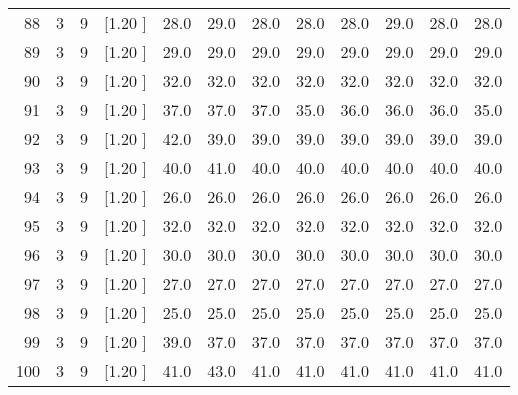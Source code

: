 \documentclass[12pt,a4paper]{article}
\begin{document}
\begin{center}
{\begin{tabular}{r r r r r r r r r r r r}
  88&  3&  9&[1.20      ]&    28.0&    29.0&    28.0&    28.0&    28.0&    29.0&    28.0&    28.0\\[-0.02in]
  89&  3&  9&[1.20      ]&    29.0&    29.0&    29.0&    29.0&    29.0&    29.0&    29.0&    29.0\\[-0.02in]
  90&  3&  9&[1.20      ]&    32.0&    32.0&    32.0&    32.0&    32.0&    32.0&    32.0&    32.0\\[-0.02in]
  91&  3&  9&[1.20      ]&    37.0&    37.0&    37.0&    35.0&    36.0&    36.0&    36.0&    35.0\\[-0.02in]
  92&  3&  9&[1.20      ]&    42.0&    39.0&    39.0&    39.0&    39.0&    39.0&    39.0&    39.0\\[-0.02in]
  93&  3&  9&[1.20      ]&    40.0&    41.0&    40.0&    40.0&    40.0&    40.0&    40.0&    40.0\\[-0.02in]
  94&  3&  9&[1.20      ]&    26.0&    26.0&    26.0&    26.0&    26.0&    26.0&    26.0&    26.0\\[-0.02in]
  95&  3&  9&[1.20      ]&    32.0&    32.0&    32.0&    32.0&    32.0&    32.0&    32.0&    32.0\\[-0.02in]
  96&  3&  9&[1.20      ]&    30.0&    30.0&    30.0&    30.0&    30.0&    30.0&    30.0&    30.0\\[-0.02in]
  97&  3&  9&[1.20      ]&    27.0&    27.0&    27.0&    27.0&    27.0&    27.0&    27.0&    27.0\\[-0.02in]
  98&  3&  9&[1.20      ]&    25.0&    25.0&    25.0&    25.0&    25.0&    25.0&    25.0&    25.0\\[-0.02in]
  99&  3&  9&[1.20      ]&    39.0&    37.0&    37.0&    37.0&    37.0&    37.0&    37.0&    37.0\\[-0.02in]
 100&  3&  9&[1.20      ]&    41.0&    43.0&    41.0&    41.0&    41.0&    41.0&    41.0&    41.0\\[-0.02in]

\hline
\end{tabular}}
\end{center}
\end{document}
